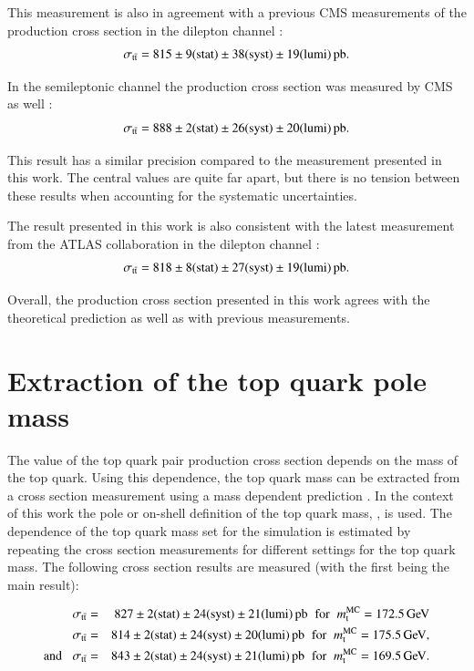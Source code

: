 This measurement is also in agreement with a previous CMS measurements of the \ttbar production cross section in the dilepton channel \cite{Khachatryan:2016kzg}:
\begin{equation}
\sigma_{\mathrm{t}\bar{\mathrm{t}}} = 815 \pm  9 ({\rm stat}) \pm 38 ({\rm syst}) \pm 19 ({\rm lumi}) \mbox{\ensuremath{\,\text{pb}}}.
\end{equation}

In the semileptonic channel the \ttbar production cross section was measured by CMS as well \cite{Sirunyan:2017uhy}:
\begin{equation}
\sigma_{\mathrm{t}\bar{\mathrm{t}}} = 888 \pm  2 ({\rm stat}) \pm 26 ({\rm syst}) \pm 20 ({\rm lumi}) \mbox{\ensuremath{\,\text{pb}}}.
\end{equation}

This result has a similar precision compared to the measurement presented in this work. The central values are quite far apart, but there is no tension between these results when accounting for the systematic uncertainties.

The result presented in this work is also consistent with the latest measurement from the ATLAS collaboration in the dilepton channel \cite{Aaboud:2016pbd}:
\begin{equation}
\sigma_{\mathrm{t}\bar{\mathrm{t}}} = 818 \pm  8 ({\rm stat}) \pm 27 ({\rm syst}) \pm 19 ({\rm lumi}) \mbox{\ensuremath{\,\text{pb}}}.
\end{equation}

Overall, the \ttbar production cross section presented in this work agrees with the theoretical prediction as well as with previous measurements.

\section{Extraction of the top quark pole mass}
\label{sec:res_mass}

The value of the top quark pair production cross section depends on the mass of the top quark. Using this dependence, the top quark mass can be extracted from a \ttbar cross section measurement using a mass dependent prediction \cite{Khachatryan:2016mqs}.
In the context of this work the pole or on-shell definition of the top quark mass, \mtp, is used.  
The dependence of the top quark mass set for the simulation is estimated by repeating the \ttbar cross section measurements for different settings for the top quark mass.
The following cross section results are measured (with the first being the main result):

\begin{eqnarray*}
\sigma_{\mathrm{t}\bar{\mathrm{t}}} & = & 827 \pm 2 ({\rm stat}) \pm 24 ({\rm syst}) \pm 21 ({\rm lumi}) \mbox{\ensuremath{\,\text{pb}}} \hspace{0.2cm}  \mathrm{for} \;\; m_\mathrm{t}^{\mathrm{MC}} = 172.5 \,\text{Ge\hspace{-.08em}V} \\
\sigma_{\mathrm{t}\bar{\mathrm{t}}} & = & 814 \pm  2 ({\rm stat}) \pm 24 ({\rm syst}) \pm 20 ({\rm lumi}) \mbox{\ensuremath{\,\text{pb}}} \hspace{0.2cm}  \mathrm{for} \; \;  m_\mathrm{t}^{\mathrm{MC}} = 175.5 \,\text{Ge\hspace{-.08em}V}, \\
\mathrm{and} \; \; \; \sigma_{\mathrm{t}\bar{\mathrm{t}}} & = & 843 \pm  2 ({\rm stat}) \pm 24 ({\rm syst}) \pm 21 ({\rm lumi}) \mbox{\ensuremath{\,\text{pb}}}  \hspace{0.2cm}  \mathrm{for} \;\; m_\mathrm{t}^{\mathrm{MC}} = 169.5 \,\text{Ge\hspace{-.08em}V}.
\end{eqnarray*} 

